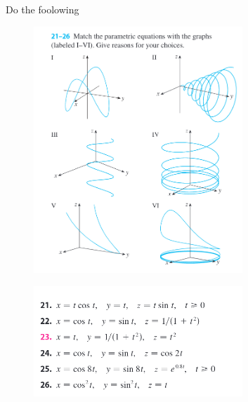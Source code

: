 \documentclass[12pt]{amsart}
\begin{document}
\newpage
\begin{question}
	Do the foolowing
	\begin{figure}[ht]
		\begin{center}
			\includegraphics[width=0.7\textwidth]{w5-1.png}
		\end{center}
	\end{figure}

	\begin{figure}[ht]
		\begin{center}
			\includegraphics[width=0.7\textwidth]{w5-2.png}
		\end{center}
	\end{figure}


\end{question}
\end{document}
